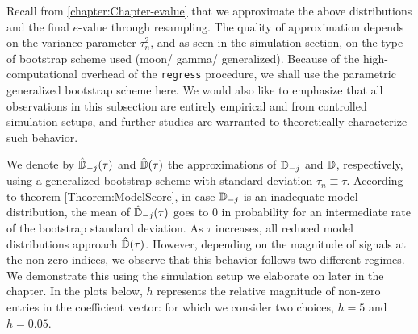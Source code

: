 Recall from \ref{chapter:Chapter-evalue} that we approximate the above distributions and the final $e$-value through resampling. The quality of approximation depends on the variance parameter $\tau_n^2$, and as seen in the simulation section, on the type of bootstrap scheme used (moon/ gamma/ generalized). Because of the high-computational overhead of the \texttt{regress} procedure, we shall use the parametric generalized bootstrap scheme here. We would also like to emphasize that all observations in this subsection are entirely empirical and from controlled simulation setups, and further studies are warranted to theoretically characterize such behavior.

We denote by $\hat {{\mathbb{D}}}_{-j} (\tau)$ and $\hat{{\mathbb{D}}} (\tau)$ the approximations of ${\mathbb{D}}_{-j}$ and ${\mathbb{D}}$, respectively, using a generalized bootstrap scheme with standard deviation $\tau_n \equiv \tau$. According to theorem \ref{Theorem:ModelScore}, in case ${\mathbb{D}}_{-j}$ is an inadequate model distribution, the mean of $\hat {{\mathbb{D}}}_{-j} (\tau)$ goes to 0 in probability for an intermediate rate of the bootstrap standard deviation. As $\tau$ increases, all reduced model distributions approach $\hat{{\mathbb{D}}} (\tau)$. However, depending on the magnitude of signals at the non-zero indices, we observe that this behavior follows two different regimes. We demonstrate this using the simulation setup we elaborate on later in the chapter. In the plots below, $h$ represents the relative magnitude of non-zero entries in the coefficient vector: for which we consider two choices, $h=5$ and $h=0.05$.

